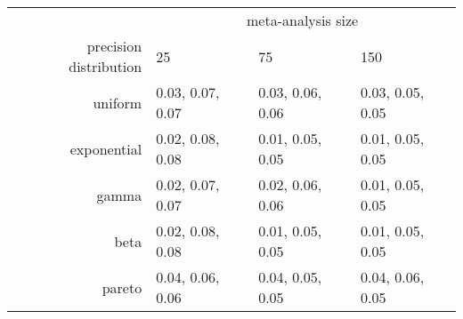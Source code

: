 \begin{tabular}{rlll}
  \hline
  & \multicolumn{3}{c}{meta-analysis size} \\
 precision distribution &25&75&150\\
 \hline
uniform & 0.03, 0.07, 0.07 & 0.03, 0.06, 0.06 & 0.03, 0.05, 0.05 \\ 
  exponential & 0.02, 0.08, 0.08 & 0.01, 0.05, 0.05 & 0.01, 0.05, 0.05 \\ 
  gamma & 0.02, 0.07, 0.07 & 0.02, 0.06, 0.06 & 0.01, 0.05, 0.05 \\ 
  beta & 0.02, 0.08, 0.08 & 0.01, 0.05, 0.05 & 0.01, 0.05, 0.05 \\ 
  pareto & 0.04, 0.06, 0.06 & 0.04, 0.05, 0.05 & 0.04, 0.06, 0.05 \\ 
   \hline
\end{tabular}
